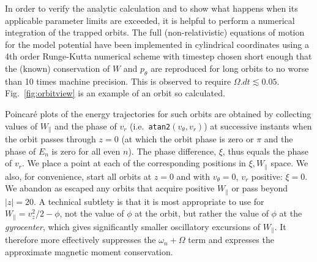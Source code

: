 \documentclass{agujournal2019}
\begin{document}
In order to verify the analytic calculation and to show what happens
when its applicable parameter limits are exceeded, it is helpful to
perform a numerical integration of the trapped orbits. The full
(non-relativistic) equations of motion for the model potential have
been implemented in cylindrical coordinates using a 4th order
Runge-Kutta numerical scheme with timestep chosen short enough that
the (known) conservation of $W$ and $p_\theta$ are reproduced for long
orbits to no worse than 10 times machine precision. This is observed
to require $\Omega.dt\lesssim 0.05$. Fig.\ \ref{fig:orbitview} is an
example of an orbit so calculated.

Poincar\'e plots of the energy trajectories for such orbits are
obtained by collecting values of $W_\parallel$ and the phase of $v_r$
(i.e.\ \verb!atan2!$(v_\theta,v_r)$) at successive instants when the orbit passes through $z=0$ (at which
the orbit phase is zero or $\pi$ and the phase of $E_n$ is zero for
all even $n$). The phase difference, $\xi$, thus equals the phase of
$v_r$. We place a point at each of the corresponding positions in
$\xi,W_\parallel$ space. We also, for convenience, start all orbits at
$z=0$ and with $v_\theta=0$, $v_r$ positive: $\xi=0$. We abandon as escaped any
orbits that acquire positive $W_\parallel$ or pass beyond $|z|=20$.  A
technical subtlety is that it is most appropriate to use for
$W_\parallel=v_z^2/2-\phi$, not the value of $\phi$ at the orbit, but
rather the value of $\phi$ at the \emph{gyrocenter}, which gives
significantly smaller oscillatory excursions of $W_\parallel$. It
therefore more effectively suppresses the $\omega_n+\Omega$ term and
expresses the approximate magnetic moment conservation.
\end{document}
